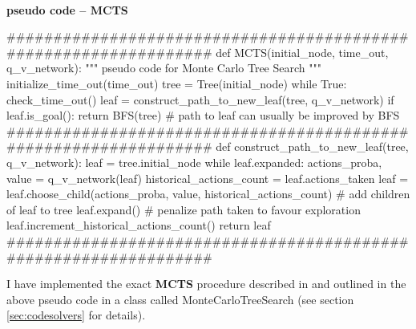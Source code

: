 \paragraph{}{\textbf{pseudo code -- \textbf{MCTS}}}
\begin{pseudocode}
#################################################################
def MCTS(initial_node, time_out, q_v_network):
    """ pseudo code for Monte Carlo Tree Search """
    initialize_time_out(time_out)
    tree = Tree(initial_node)
    while True:
        check_time_out()
        leaf = construct_path_to_new_leaf(tree, q_v_network)
        if leaf.is_goal():
            return BFS(tree) # path to leaf can usually be improved by BFS
#################################################################
def construct_path_to_new_leaf(tree, q_v_network):
    leaf = tree.initial_node
    while leaf.expanded:
        actions_proba, value = q_v_network(leaf)
        historical_actions_count = leaf.actions_taken
        leaf = leaf.choose_child(actions_proba,
                                 value,
                                 historical_actions_count)
    # add children of leaf to tree
    leaf.expand()
    # penalize path taken to favour exploration
    leaf.increment_historical_actions_count()
    return leaf
#################################################################
\end{pseudocode}
\black

I have implemented the exact \textbf{MCTS} procedure described in \cite{https://doi.org/10.48550/arxiv.1805.07470} and outlined in the above pseudo code in  a class called MonteCarloTreeSearch (see section \ref{sec:codesolvers} for details).




































